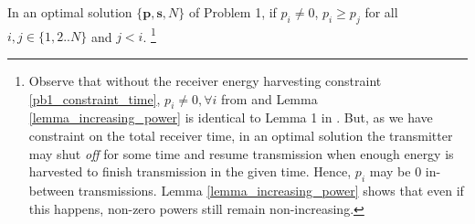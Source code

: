 
\begin{lemma}
In an optimal solution $\{\bm{p},\bm{s},N\}$ of Problem 1, if $p_i\neq 0$, $p_i\ge p_j$ for all $i,j\in \{1,2..N\}$ and $j<i$.
\footnote{\label{note1}Observe that without the receiver energy harvesting constraint \eqref{pb1_constraint_time}, $p_i\neq 0,\forall i$ from \cite{Yang} and Lemma \ref{lemma_increasing_power} is identical to  Lemma 1 in \cite{Yang}. But, as we have constraint on the total receiver time, in an optimal solution the transmitter may shut \textit{off} for some time and resume transmission when enough energy is harvested to finish transmission in the given time. Hence, $p_i$ may be $0$ in-between transmissions. Lemma \ref{lemma_increasing_power} shows that even if this happens, non-zero powers still remain non-increasing.
}
\label{lemma_increasing_power}
\end{lemma}
 
